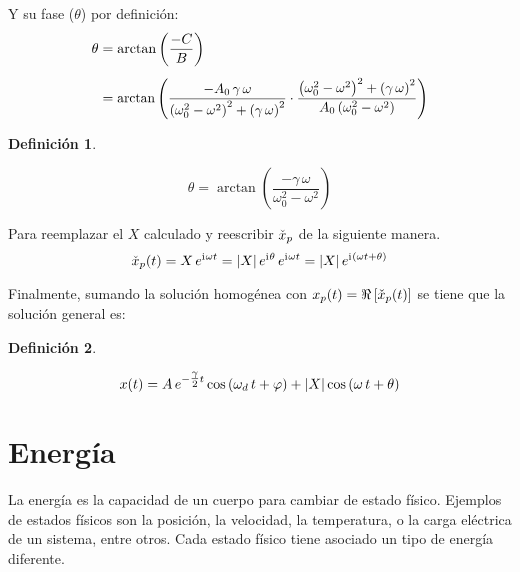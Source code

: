 \documentclass[a5paper,12pt,twoside]{book}
\newtheorem{defn}{{Definición}}[chapter]
\begin{document}
Y su fase ($\theta$) por definición:
\begin{align*}
    \theta &= \arctan \left( \frac{-C}{B} \right)
    \\[1ex]
    &=
    \scale{0.97}{
    \arctan \left( \frac{-A_0 \, \gamma \, \omega}{\left( \omega_0^2 - \omega^2 \right)^2 + \left( \gamma \, \omega \right)^2} \cdot \frac{\left( \omega_0^2 - \omega^2 \right)^2 + \left( \gamma \, \omega \right)^2}{A_0 \left( \omega_0^2 - \omega^2 \right)} \right)
    }
\end{align*}

\begin{mdframed}[style=MyFrame1]
    \begin{defn}
    \end{defn}
    \begin{equation*}
        \theta = \arctan \left( \frac{-\gamma \, \omega}{\omega_0^2 - \omega^2} \right)
    \end{equation*}
\end{mdframed}

Para reemplazar el $X$ calculado y reescribir $\check{x}_p$ de la siguiente manera.
\[
    \check{x}_p(t) = X \, e^{\mathrm{i}\mkern1mu \omega t} = {\left| {X} \right|} \, e^{\mathrm{i}\mkern1mu \theta} \, e^{\mathrm{i}\mkern1mu \omega t} = {\left| {X} \right|} \, e^{\mathrm{i}\mkern1mu \left(\omega t + \theta \right)}
\]

Finalmente, sumando la solución homogénea con $x_p(t) = \Re \left[ \check{x}_p(t) \right]$ se tiene que la solución general es:

\begin{mdframed}[style=MyFrame1]
    \begin{defn}
    \end{defn}
    \begin{equation*}
        x(t) = A \, e^{-\tfrac{\gamma}{2} t} \cos \left( \omega_d \, t + \varphi \right) + {\left| {X} \right|} \cos \left( \omega \, t + \theta \right)
    \end{equation*}
\end{mdframed}


\chapter{Energía}

La energía es la capacidad de un cuerpo para cambiar de estado físico. Ejemplos de estados físicos son la posición, la velocidad, la temperatura, o la carga eléctrica de un sistema, entre otros. Cada estado físico tiene asociado un tipo de energía diferente.
\end{document}
